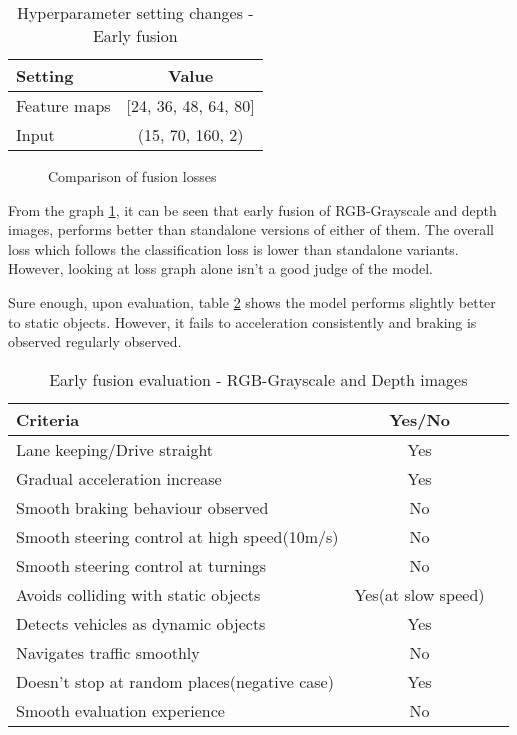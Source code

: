 \begin{table}[!ht]
    \centering
\begin{tabular}{lc}
    \toprule
    Setting  & Value  \\\midrule
    Feature maps  & [24, 36, 48, 64, 80]  \\
    Input  & (15, 70, 160, 2)\\\bottomrule
\end{tabular}
\caption{Hyperparameter setting changes - Early fusion}
\label{table:paramsEF}
\end{table}
\begin{figure}[!ht]
    \centering
    \def\svgwidth{\textwidth}
    
    \caption{Comparison of fusion losses}
    \label{fig:datafusionlosses1}
\end{figure}
From the graph \ref{fig:datafusionlosses1}, it can be seen that early fusion of
RGB-Grayscale and depth images, performs better than standalone versions of either of
them. The overall loss which follows the classification loss is lower than standalone
variants. However, looking at loss graph alone isn't a good judge of the model.

Sure enough, upon evaluation, table \ref{table:earlyfusionrgbdepth} shows the model
performs slightly better to static objects. However, it fails to acceleration consistently
and braking is observed regularly observed.
\begin{table}[!ht]
    \centering
\begin{tabular}{lcc}
    \toprule
    Criteria  & Yes/No  \\\midrule
    Lane keeping/Drive straight  & Yes  \\
    Gradual acceleration increase  & Yes\\
    Smooth braking behaviour observed & No \\
    Smooth steering control at high speed(10m/s) & No \\
    Smooth steering control at turnings & No\\
    Avoids colliding with static objects & Yes(at slow speed) \\
    Detects vehicles as dynamic objects & Yes \\
    Navigates traffic smoothly & No\\
    Doesn't stop at random places(negative case) & Yes \\
    Smooth evaluation experience & No \\\bottomrule
\end{tabular}
\caption{Early fusion evaluation - RGB-Grayscale and Depth images}
\label{table:earlyfusionrgbdepth}
\end{table}


